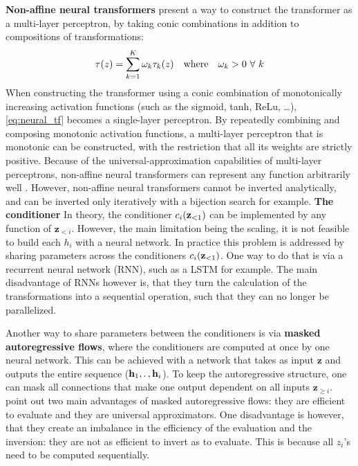 \documentclass[english]{scrartcl}
\begin{document}
    \textbf{Non-affine neural transformers} present a way to construct the transformer as a multi-layer perceptron, by taking conic combinations in addition to compositions of transformations:
    \begin{equation}
        \label{eq:neural_tf}
        \tau (z) = \sum _{k=1} ^{K} \omega_k \tau _k(z) \quad \text{where} \quad\omega_k > 0\ \forall\ k
    \end{equation}
    When constructing the transformer using a conic combination of monotonically increasing activation functions (such as the sigmoid, tanh, ReLu, \ldots), \cref{eq:neural_tf} becomes a single-layer perceptron.
    By repeatedly combining and composing monotonic activation functions, a multi-layer perceptron that is monotonic can be constructed, with the restriction that all its weights are strictly positive.
    Because of the universal-approximation capabilities of multi-layer perceptrons, non-affine neural transformers can represent any function arbitrarily well \parencite{huang_neural_2018}.
    However, non-affine neural transformers cannot be inverted analytically, and can be inverted only iteratively with a bijection search for example.
    \newline
    \textbf{The conditioner}
    \newline
    In theory, the conditioner $c_i(\textbf{z}_{<1})$ can be implemented by any function of $\textbf{z}_{<i}$.
    However, the main limitation being the scaling, it is not feasible to build each $h_i$ with a neural network.
    In practice this problem is addressed by sharing parameters across the conditioners $c_i(\textbf{z}_{<1})$.
    One way to do that is via a recurrent neural network (RNN), such as a LSTM \parencite{hochreiter_long_1997} for example.
    The main disadvantage of RNNs however is, that they turn the calculation of the transformations into a sequential operation, such that they can no longer be parallelized.

    Another way to share parameters between the conditioners is via \textbf{masked autoregressive flows}, where the conditioners are computed at once by one neural network.
    This can be achieved with a network that takes as input $\textbf{z}$ and outputs the entire sequence ($\textbf{h}_1, \ldotp, \textbf{h}_i$).
    To keep the autoregressive structure, one can mask all connections that make one output dependent on all inputs $\textbf{z}_{\geq i}$.
    \Cite{papamakarios_normalizing_2019} point out two main advantages of masked autoregressive flows: they are efficient to evaluate and they are universal approximators.
    One disadvantage is however, that they create an imbalance in the efficiency of the evaluation and the inversion: they are not as efficient to invert as to evaluate.
    This is because all $z_i$'s need to be computed sequentially.
\end{document}
